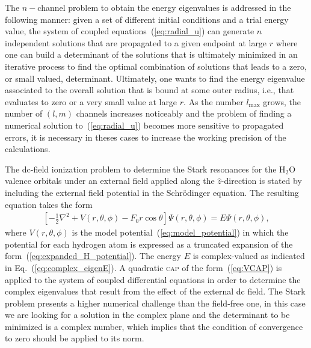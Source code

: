 The $n-$channel problem to obtain the energy eigenvalues is addressed
in the following manner: given a set of different initial conditions
and a trial energy value, the system of coupled
equations~(\ref{eq:radial_u}) can generate $n$ independent solutions
that are propagated to a given endpoint at large $r$ where one can
build a determinant of the solutions that is ultimately minimized in
an iterative process to find the optimal combination of solutions that
leads to a zero, or small valued, determinant. Ultimately, one wants
to find the energy eigenvalue associated to the overall solution that
is bound at some outer radius, i.e., that evaluates to zero or a very
small value at large $r$. As the number $l_{\mathrm{max}}$ grows, the
number of $(l,m)$ channels increases noticeably and the problem of
finding a numerical solution to~(\ref{eq:radial_u}) becomes more
sensitive to propagated errors, it is necessary in theses cases to
increase the working precision of the calculations.


The dc-field ionization problem to determine the Stark resonances for
the H$_{2}$O valence orbitals under an external field applied along
the $\hat{z}$-direction is stated by including the external field
potential in the Schr\"{o}dinger equation. The resulting equation
takes the form~\cite{marko_partialwave}
%
\begin{eqnarray}
    \left[
      -\frac{1}{2}\nabla^{2} + V(r, \theta, \phi) -
      F_{0} r \cos\theta
    \right] \Psi(r, \theta, \phi) = E \Psi(r, \theta, \phi),
  \label{eq:dc_field_sch_eq}
\end{eqnarray}
%
where $V(r, \theta, \phi)$ is the model
potential~(\ref{eq:model_potential}) in which the potential for each
hydrogen atom is expressed as a truncated expansion of the
form~(\ref{eq:expanded_H_potential}). The energy $E$ is complex-valued
as indicated in Eq.~(\ref{eq:complex_eigenE}). A quadratic
\textsc{cap} of the form~(\ref{eq:VCAP}) is applied to the system of
coupled differential equations in order to determine the complex
eigenvalues that result from the effect of the external dc field. The
Stark problem presents a higher numerical challenge than the
field-free one, in this case we are looking for a solution in the
complex plane and the determinant to be minimized is a complex number,
which implies that the condition of convergence to zero should be
applied to its norm.


